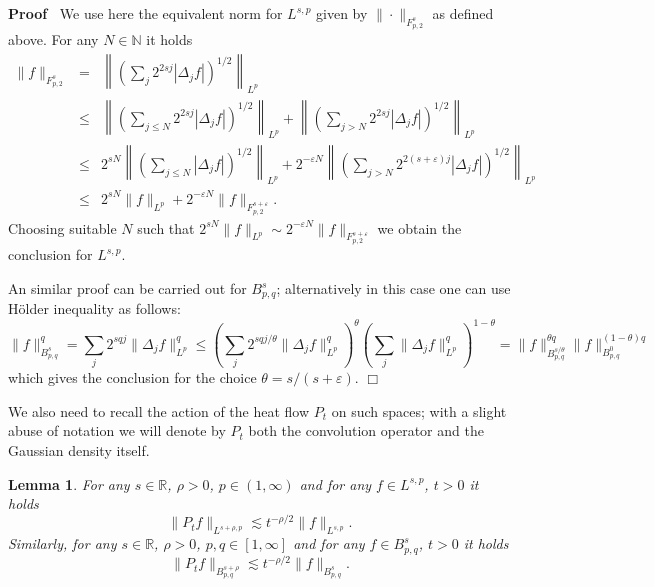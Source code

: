 \documentclass[10pt]{article}
\newenvironment{proof}{\noindent\textbf{Proof\ }}{\hspace*{\fill}$\Box$\medskip}
\newtheorem{lemma}{Lemma}
\begin{document}
\begin{proof}
  We use here the equivalent norm for $L^{s, p}$ given by $\| \cdot
  \|_{F^s_{p, 2}}$ as defined above. For any $N \in \mathbb{N}$ it holds
  \begin{eqnarray*}
    \| f \|_{F^s_{p, 2}} & = & \left\| \left( \sum_j 2^{2 s j} | \Delta_j f |
    \right)^{1 / 2} \right\|_{L^p}\\
    & \leqslant & \left\| \left( \sum_{j \leqslant N} 2^{2 s j} | \Delta_j f
    | \right)^{1 / 2} \right\|_{L^p} + \left\| \left( \sum_{j > N} 2^{2 s j} |
    \Delta_j f | \right)^{1 / 2} \right\|_{L^p}\\
    & \leqslant & 2^{s N} \left\| \left( \sum_{j \leqslant N} | \Delta_j f |
    \right)^{1 / 2} \right\|_{L^p} + 2^{- \varepsilon N} \left\| \left(
    \sum_{j > N} 2^{2 (s + \varepsilon) j} | \Delta_j f | \right)^{1 / 2}
    \right\|_{L^p}\\
    & \leqslant & 2^{s N} \| f \|_{L^p} + 2^{- \varepsilon N} \| f \|_{F^{s +
    \varepsilon}_{p, 2}} .
  \end{eqnarray*}
  Choosing suitable $N$ such that $2^{s N} \| f \|_{L^p} \sim 2^{- \varepsilon
  N} \| f \|_{F^{s + \varepsilon}_{p, 2}}$ we obtain the conclusion for $L^{s,
  p}$.
  
  An similar proof can be carried out for $B^s_{p, q}$; alternatively in this
  case one can use H{\"o}lder inequality as follows:
  \[ \| f \|^q_{B^s_{p, q}} = \sum_j 2^{s q j} \| \Delta_j f \|^q_{L^p}
     \leqslant \left( \sum_j 2^{s q j / \theta} \| \Delta_j f \|^q_{L^p}
     \right)^{\theta} \left( \sum_j \| \Delta_j f \|^q_{L^p} \right)^{1 -
     \theta} = \| f \|^{\theta q}_{B^{s / \theta}_{p, q}} \| f \|_{B^0_{p,
     q}}^{(1 - \theta) q} \]
  which gives the conclusion for the choice $\theta = s / (s + \varepsilon)$.
\end{proof}

We also need to recall the action of the heat flow $P_t$ on such spaces; with
a slight abuse of notation we will denote by $P_t$ both the convolution
operator and the Gaussian density itself.

\begin{lemma}
  \label{appendixA2 heat kernel estimates}For any $s \in \mathbb{R}$, $\rho >
  0$, $p \in (1, \infty)$ and for any $f \in L^{s, p}$, $t > 0$ it holds
  \[ \| P_t f \|_{L^{s + \rho, p}} \lesssim t^{- \rho / 2} \| f \|_{L^{s, p}}
     . \]
  Similarly, for any $s \in \mathbb{R}$, $\rho > 0$, $p, q \in [1, \infty]$
  and for any $f \in B^s_{p, q}$, $t > 0$ it holds
  \[ \| P_t f \|_{B^{s + \rho}_{p, q}} \lesssim t^{- \rho / 2} \| f
     \|_{B^s_{p, q}} . \]
\end{lemma}
\end{document}
